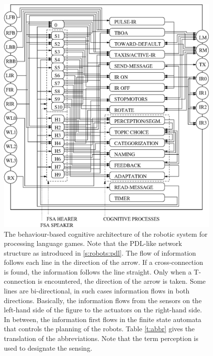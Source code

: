 \begin{figure}
\centerline{\includegraphics[width=12cm]{lang_games/architecture.eps}}
\caption{The behaviour-based cognitive architecture of the robotic system for processing language games. Note that the PDL-like network structure as introduced in \ref{s:robots:pdl}. The flow of information follows each line in the direction of the arrow. If a cross-connection is found, the information follows the line straight. Only when a T-connection is encountered, the direction of the arrow is taken. Some lines are bi-directional, in such cases information flows in both directions. Basically, the information flows from the sensors on the left-hand side of the figure to the actuators on the right-hand side. In between, the information first flows in the finite state automata that controls the planning of the robots. Table \ref{t:abbr} gives the translation of the abbreviations. Note that the term perception is used to designate the sensing.}
\label{f:architecture}
\end{figure}

